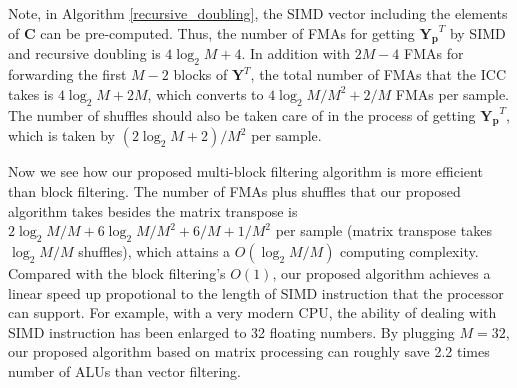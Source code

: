 

Note, in Algorithm \ref{recursive_doubling}, the SIMD vector including the elem\-ents of $\bm{C}$ 
can be pre-computed. Thus, the number of FMAs for getting $\bm{Y_p}^T$ by SIMD and recursive doubling is $4\log_2M+4$.
In addition with $2M-4$ FMAs for forwarding the first $M{-}2$ blocks of $\bm{Y}^T$,
the total number of FMAs that the ICC takes is $4\log_2M+2M$, which converts to $4\log_2M/M^2{+}2/M$ FMAs per sample.
The number of shuffles should also be taken care of in the process of getting $\bm{Y_p}^T$,
which is taken by $(2\log_2M+2)/M^2$ per sample.




Now we see how our proposed multi-block filtering algori\-thm is more efficient than block filtering. The number of FMAs plus shuffles that our proposed algorithm takes
besides the matrix transpose is $2\log_2M/M+6\log_2M/M^2+6/M+1/M^2$ per sample (matrix transpose takes $\log_2M/M$ shuffles), which
attains a $O(\log_2M/M)$ computing complexity. Compared with the block filtering's $O(1)$, our proposed algorithm
achieves a linear speed up propotional to the length of SIMD instruction that the processor can support.
For example, with a very modern CPU, the ability of dealing with SIMD instruction has been enlarged to 32 floating numbers. By plugging $M=32$,
our proposed algorithm based on matrix processing can roughly save 2.2 times number of ALUs than vector filtering.

